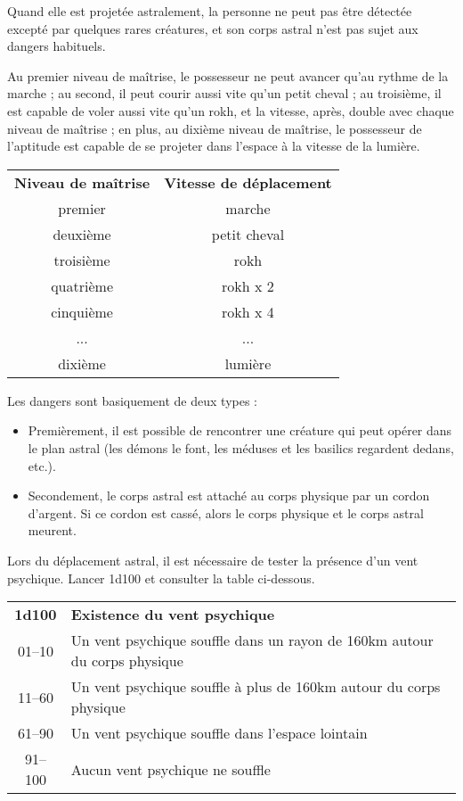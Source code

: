 \bigskip

Quand elle est projetée astralement, la personne ne peut pas être détectée excepté par quelques rares créatures, et son corps astral n'est pas sujet aux dangers habituels.

\bigskip

Au premier niveau de maîtrise, le possesseur ne peut avancer qu'au rythme de la marche ; au second, il peut courir aussi vite qu'un petit cheval ; au troisième, il est capable de voler aussi vite qu'un rokh, et la vitesse, après, double avec chaque niveau de maîtrise ; en plus, au dixième niveau de maîtrise, le possesseur de l'aptitude est capable de se projeter dans l'espace à la vitesse de la lumière.

\bigskip
\begin{tabular}{cc}
\textbf{Niveau de maîtrise} & \textbf{Vitesse de déplacement} \\
premier     & marche \\
deuxième    & petit cheval \\
troisième   & rokh \\
quatrième   & rokh x 2 \\
cinquième   & rokh x 4 \\
...         & ... \\
dixième     & lumière \\
\end{tabular}

\bigskip

Les dangers sont basiquement de deux types :

\bigskip

\begin{itemize}
\item Premièrement, il est possible de rencontrer une créature qui peut opérer dans le plan astral (les démons le font, les méduses et les basilics regardent dedans, etc.).
\item Secondement, le corps astral est attaché au corps physique par un cordon d'argent. Si ce cordon est cassé, alors le corps physique et le corps astral meurent.
\end{itemize}

\bigskip

Lors du déplacement astral, il est nécessaire de tester la présence d'un vent psychique. Lancer 1d100 et consulter la table ci-dessous.

\bigskip

\begin{tabular}{cl}
\textbf{1d100} & \textbf{Existence du vent psychique} \\
01--10 & Un vent psychique souffle dans un rayon de 160km autour du corps physique \\
11--60 & Un vent psychique souffle à plus de 160km autour du corps physique \\
61--90 & Un vent psychique souffle dans l'espace lointain \\
91--100 & Aucun vent psychique ne souffle \\
\end{tabular}

